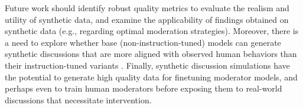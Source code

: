 %

Future work should identify robust quality metrics to evaluate the realism and utility of synthetic data, and examine the applicability of findings obtained on synthetic data (e.g., regarding optimal moderation strategies). Moreover, there is a need to explore whether base  (non-instruction-tuned) models can generate synthetic discussions that are more aligned with observed human behaviors than their instruction-tuned variants \cite{anthis_2025}. Finally, synthetic discussion simulations have the potential to generate high quality data for finetuning moderator models, and perhaps even to train human moderators before exposing them to real-world discussions that necessitate intervention.